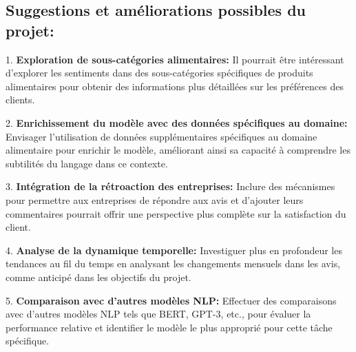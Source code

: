 
\subsection{Suggestions et améliorations possibles du projet:}

1. \textbf{Exploration de sous-catégories alimentaires:} Il pourrait être intéressant d'explorer les sentiments dans des sous-catégories spécifiques de produits alimentaires pour obtenir des informations plus détaillées sur les préférences des clients.

2. \textbf{Enrichissement du modèle avec des données spécifiques au domaine:} Envisager l'utilisation de données supplémentaires spécifiques au domaine alimentaire pour enrichir le modèle, améliorant ainsi sa capacité à comprendre les subtilités du langage dans ce contexte.

3. \textbf{Intégration de la rétroaction des entreprises:} Inclure des mécanismes pour permettre aux entreprises de répondre aux avis et d'ajouter leurs commentaires pourrait offrir une perspective plus complète sur la satisfaction du client.

4. \textbf{Analyse de la dynamique temporelle:} Investiguer plus en profondeur les tendances au fil du temps en analysant les changements mensuels dans les avis, comme anticipé dans les objectifs du projet.

5. \textbf{Comparaison avec d'autres modèles NLP:} Effectuer des comparaisons avec d'autres modèles NLP tels que BERT, GPT-3, etc., pour évaluer la performance relative et identifier le modèle le plus approprié pour cette tâche spécifique.